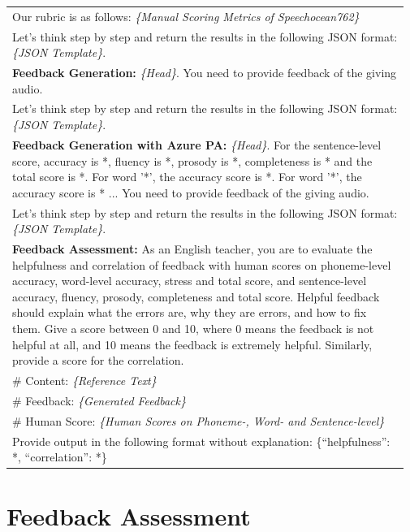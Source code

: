\documentclass{Interspeech}
\begin{document}
\begin{table}[th]
\begin{tabular}{p{0.97\linewidth}}
    Our rubric is as follows: \textit{\{Manual Scoring Metrics of Speechocean762\}} \\
    Let's think step by step and return the results in the following JSON format: \textit{\{JSON Template\}}. \\
    \hline
    \textbf{Feedback Generation:} \textit{\{Head\}}. You need to provide feedback of the giving audio. \\
    Let's think step by step and return the results in the following JSON format: \textit{\{JSON Template\}}. \\
    \midrule
    \textbf{Feedback Generation with Azure PA:} \textit{\{Head\}}. For the sentence-level score, accuracy is *, fluency is *, prosody is *, completeness is * and the total score is *. For word '*', the accuracy score is *. For word '*', the accuracy score is * ... You need to provide feedback of the giving audio. \\
    Let's think step by step and return the results in the following JSON format: \textit{\{JSON Template\}}. \\
    \midrule
    \textbf{Feedback Assessment:} As an English teacher, you are to evaluate the helpfulness and correlation of feedback with human scores on phoneme-level accuracy, word-level accuracy, stress and total score, and sentence-level accuracy, fluency, prosody, completeness and total score. Helpful feedback should explain what the errors are, why they are errors, and how to fix them. Give a score between 0 and 10, where 0 means the feedback is not helpful at all, and 10 means the feedback is extremely helpful. Similarly, provide a score for the correlation. \\
    \# Content: \textit{\{Reference Text\}} \\
    \# Feedback: \textit{\{Generated Feedback\}} \\
    \# Human Score: \textit{\{Human Scores on Phoneme-, Word- and Sentence-level\}} \\
    Provide output in the following format without explanation: \{``helpfulness'': *, ``correlation'': *\} \\
    \bottomrule
  \end{tabular}
\end{table}

\newpage
\section{Feedback Assessment}
\label{app:feedback}
\end{document}
